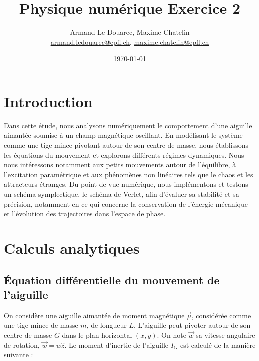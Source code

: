 \documentclass[a4paper,12pt,twoside]{article}
\newcommand{\mail}[1]{{\href{mailto:#1}{#1}}}
\begin{document}
\title{Physique numérique Exercice 2}
\author{Armand Le Douarec, Maxime Chatelin\\  %
{\small \mail{armand.ledouarec@epfl.ch}, \mail{maxime.chatelin@epfl.ch}}}
\date{\today}\maketitle
\tableofcontents %

\baselineskip=16pt
\parindent=0pt
\parskip=12pt

\section{Introduction}

Dans cette étude, nous analysons numériquement le comportement d’une aiguille aimantée soumise à un champ magnétique oscillant. En modélisant le système comme une tige mince pivotant autour de son centre de masse, nous établissons les équations du mouvement et explorons différents régimes dynamiques. Nous nous intéressons notamment aux petits mouvements autour de l’équilibre, à l’excitation paramétrique et aux phénomènes non linéaires tels que le chaos et les attracteurs étranges. Du point de vue numérique, nous implémentons et testons un schéma symplectique, le schéma de Verlet, afin d’évaluer sa stabilité et sa précision, notamment en ce qui concerne la conservation de l’énergie mécanique et l’évolution des trajectoires dans l’espace de phase.

\section{Calculs analytiques}

\subsection{Équation différentielle du mouvement de l'aiguille}

On considère une aiguille aimantée de moment magnétique $\vec{\mu}$, considérée comme une tige mince de masse $m$, de longueur $L$. L'aiguille peut pivoter autour de son centre de masse $G$ dans le plan horizontal $(x, y)$. On note $\vec{w}$ sa vitesse angulaire de rotation, $\vec{w} = w\hat{z}$. Le moment d'inertie de l'aiguille $I_G$ est calculé de la manière suivante :\\
\end{document}

